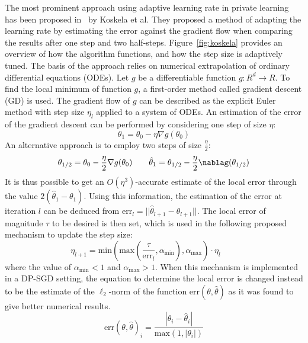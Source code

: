 The most prominent approach using adaptive learning rate in private learning has been proposed in~\cite{RefWorks:RefID:38-koskelalearning} by Koskela et al. They proposed a method of adapting the learning rate by estimating the error against the gradient flow when comparing the results after one step and two half-steps. Figure~\ref{fig:koskela} provides an overview of how the algorithm functions, and how the step size is adaptively tuned. The basis of the approach relies on numerical extrapolation of ordinary differential equations (ODEs). Let $g$ be a differentiable function $g:R^d\rightarrow R$. To find the local minimum of function $g$, a first-order method called gradient descent (GD) is used. The gradient flow of $g$ can be described as the explicit Euler method with step size $\eta_l$ applied to a system of ODEs. An estimation of the error of the gradient descent can be performed by considering one step of size $\eta$:
\[ \theta_1=\theta_0-\eta \nabla g(\theta_0)\]
An alternative approach is to employ two steps of size $\frac{\eta}{2}$:
\[ \theta_{1/2}=\theta_0-\frac{\eta}{2}\nabla g(\theta_0) \qquad \hat{\theta}_1=\theta_{1/2}-\frac{\eta}{2}\nablag(\theta_{1/2})\]
It is thus possible to get an $O(\eta^3)$-accurate estimate of the local error through the value $2(\hat{\theta}_1-\theta_1)$. Using this information, the estimation of the error at iteration $l$ can be deduced from $\text{err}_l=||\hat{\theta}_{l+1}-\theta_{l+1}||$. The local error of magnitude $\tau$ to be desired is then set, which is used in the following proposed mechanism to update the step size:
\[ \eta_{l+1}=\text{min}(\text{max}(\frac{\tau}{\text{err}_l},\alpha_\text{min}),\alpha_\text{max})\cdot\eta_l \qquad \label{eq:koskela}\]
where the value of $\alpha_\text{min}<1$ and $\alpha_\text{max}>1$. 
When this mechanism is implemented in a DP-SGD setting, the equation to determine the local error is changed instead to be the estimate of the $\ell_2$-norm of the function $\text{err}(\theta,\hat{\theta})$ as it was found to give better numerical results.
\[ \text{err}(\theta,\hat{\theta})_i = \frac{|\theta_i-\hat{\theta}_i|}{\text{max}(1,|\theta_i|)}\]
